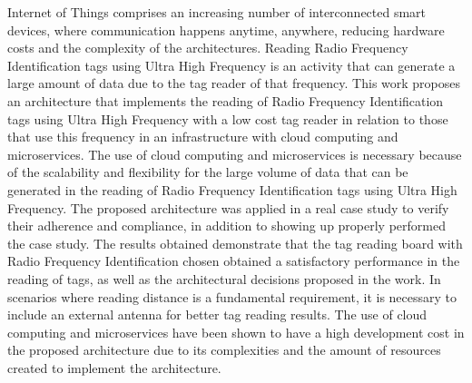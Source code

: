 Internet of Things comprises an increasing number of interconnected smart devices, where communication happens anytime, anywhere, reducing hardware costs and the complexity of the architectures. Reading Radio Frequency Identification tags using Ultra High Frequency is an activity that can generate a large amount of data due to the tag reader of that frequency. This work proposes an architecture that implements the reading of Radio Frequency Identification tags using Ultra High Frequency with a low cost tag reader in relation to those that use this frequency in an infrastructure with cloud computing and microservices. The use of cloud computing and microservices is necessary because of the scalability and flexibility for the large volume of data that can be generated in the reading of Radio Frequency Identification tags using Ultra High Frequency. The proposed architecture was applied in a real case study to verify their adherence and compliance, in addition to showing up properly performed the case study. The results obtained demonstrate that the tag reading board with Radio Frequency Identification chosen obtained a satisfactory performance in the reading of tags, as well as the architectural decisions proposed in the work. In scenarios where reading distance is a fundamental requirement, it is necessary to include an external antenna for better tag reading results. The use of cloud computing and microservices have been shown to have a high development cost in the proposed architecture due to its complexities and the amount of resources created to implement the architecture.
